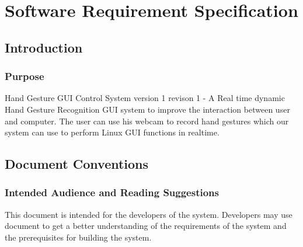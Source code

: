 \documentclass[11pt]{report}
\begin{document}
\chapter{Software Requirement Specification}

 \section{Introduction}

\subsection{Purpose}
Hand Gesture GUI Control System version 1 revison 1 - A Real time dynamic Hand Gesture Recognition GUI system to improve the interaction between user and computer. The user can use his webcam to record hand gestures which our system can use to perform Linux GUI functions in realtime.

\section{Document Conventions}


\subsection{Intended Audience and Reading Suggestions}
This document is intended for the developers of the system. Developers may use document to get a better understanding of the requirements of the system and the prerequisites for building the system.
\end{document}
